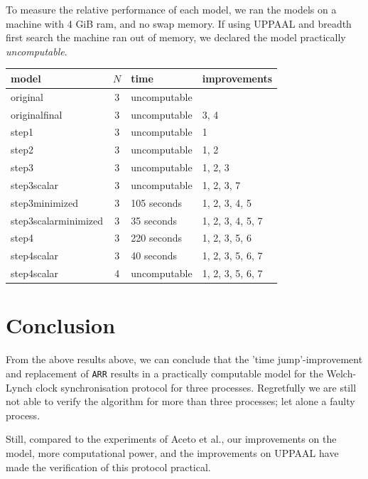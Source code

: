 \documentclass[a4paper,10pt]{article}
\newcommand{\UPPAAL}{UPPAAL\xspace}
\begin{document}
To measure the relative performance of each model, we ran the models on a machine with 4 GiB ram, and no swap memory. If using \UPPAAL and breadth first search the machine ran out of memory, we declared the model practically \emph{uncomputable}.

\vspace{1 em}

\begin{tabular}{|l|c|l|l|}
\hline
\textbf{model} & \textbf{$N$} & \textbf{time} & \textbf{improvements} \\ \hline
original & 3 & uncomputable & \\ \hline
originalfinal & 3 & uncomputable & 3, 4 \\ \hline
step1 & 3 & uncomputable & 1 \\ \hline
step2 & 3 & uncomputable & 1, 2 \\ \hline
step3 & 3 & uncomputable & 1, 2, 3 \\ \hline
step3scalar & 3 & uncomputable & 1, 2, 3, 7 \\ \hline
step3minimized & 3 & 105 seconds & 1, 2, 3, 4, 5 \\ \hline
step3scalarminimized & 3 & 35 seconds & 1, 2, 3, 4, 5, 7 \\ \hline
step4 & 3 & 220 seconds & 1, 2, 3, 5, 6\\ \hline
step4scalar & 3 & 40 seconds & 1, 2, 3, 5, 6, 7 \\ \hline
step4scalar & 4 & uncomputable & 1, 2, 3, 5, 6, 7 \\ \hline
\end{tabular}


\section{Conclusion}
	

From the above results above, we can conclude that the 'time jump'-improvement and replacement of \texttt{ARR} results in a practically computable model for the Welch-Lynch clock synchronisation protocol for three processes. Regretfully we are still not able to verify the algorithm for more than three processes; let alone a faulty process.

Still, compared to the experiments of Aceto et al., our improvements on the model, more computational power, and the improvements on UPPAAL have made the verification of this protocol practical.



\end{document}
